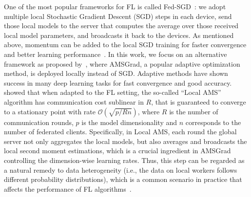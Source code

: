 \documentclass[manuscript,screen,review]{acmart}
\begin{document}

One of the most popular frameworks for FL is called Fed-SGD~\citep{mcmahan2017communication}: we adopt multiple local Stochastic Gradient Descent (SGD) steps in each device, send those local models to the server that computes the average over those received local model parameters, and broadcasts it back to the devices. As mentioned above, momentum can be added to the local SGD training for faster convergence and better learning performance~\citep{yu2019linear}. In this work, we focus on an alternative framework as proposed by~\citet{chen2020toward}, where AMSGrad, a popular adaptive optimization method, is deployed locally instead of SGD. Adaptive methods have shown success in many deep learning tasks for fast convergence and good accuracy. \citet{chen2020toward} showed that when adapted to the FL setting, the so-called ``Local AMS'' algorithm has communication cost sublinear in $R$, that is guaranteed to converge to a stationary point with rate $\mathcal{O}(\sqrt{p/Rn})$, where $R$ is the number of communication rounds, $p$ is the model dimensionality and $n$ corresponds to the number of federated clients. Specifically, in Local AMS, each round the global server not only aggregates the local models, but also averages and broadcasts the local second moment estimations, which is a crucial ingredient in AMSGrad controlling the dimension-wise learning rates. Thus, this step can be regarded as a natural remedy to data heterogeneity (i.e., the data on local workers follows different probability distributions), which is a common scenario in practice that affects the performance of FL algorithms~\citep{li2019federated,liang2019variance,karimireddy2019scaffold}.


\vspace{0.1in}
\end{document}
